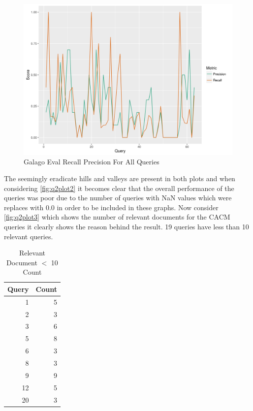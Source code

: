 \documentclass[11pt]{article}
\begin{document}
\begin{figure}[H]
\centering
\includegraphics[scale=0.9]{q2_plot_rp.png}
\caption{Galago Eval Recall Precision For All Queries}
\label{fig:q2plot2}
\end{figure}
The seemingly eradicate hills and valleys are present in both plots and when considering \autoref{fig:q2plot2} it becomes clear that the overall performance of the queries was poor due to the number of queries with NaN values which were replaces with 0.0 in order to be included in these graphs.  Now consider \autoref{fig:q2plot3} which shows the number of relevant documents for the CACM queries it clearly shows the reason behind the result. 19 queries have less than 10 relevant queries.
\begin{table}[ht]
\centering
\caption{Relevant Document $<$ 10 Count }
\begin{tabular}{rr}
  \hline
 Query & Count \\ 
  \hline
 1 &   5 \\ 
2 &   3 \\ 
  3 &   6 \\ 
  5 &   8 \\ 
   6 &   3 \\ 
   8 &   3 \\ 
  9 &   9 \\ 
  12 &   5 \\ 
20 &   3 \\ 
   \hline
\end{tabular}
\end{table}
\end{document}
